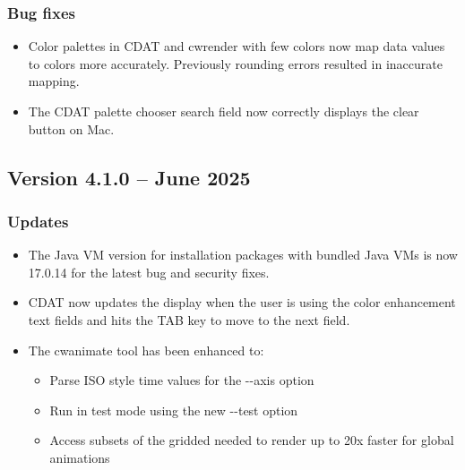 \subsubsection*{ Bug fixes}
\begin{itemize}

\item Color palettes in CDAT and cwrender with few colors now map 
data values to colors more accurately.  Previously rounding errors resulted
in inaccurate mapping.

\item The CDAT palette chooser search field now correctly displays 
the clear button on Mac.

\end{itemize}


\subsection*{Version 4.1.0 -- June 2025}

\subsubsection*{ Updates}

\begin{itemize}

\item The Java VM version for installation packages with bundled Java 
VMs is now 17.0.14 for the latest bug and security fixes.

\item CDAT now updates the display when the user is using the color
enhancement text fields and hits the TAB key to move to the next field.

\item The cwanimate tool has been enhanced to:
\begin{itemize}
  \item Parse ISO style time values for the -{-}axis option
  \item Run in test mode using the new -{-}test option
  \item Access subsets of the gridded needed to render up to 20x faster
  for global animations
\end{itemize}

\end{itemize}

